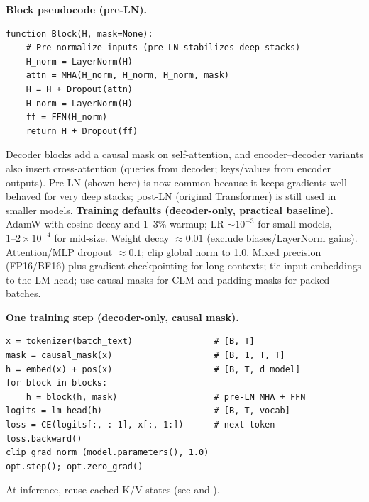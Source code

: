 \begin{tcolorbox}[summarybox, breakable, title={Implementation sketch: block pseudocode, training defaults, and one step}]
\noindent\textbf{Block pseudocode (pre-LN).}
\begin{verbatim}
function Block(H, mask=None):
    # Pre-normalize inputs (pre-LN stabilizes deep stacks)
    H_norm = LayerNorm(H)
    attn = MHA(H_norm, H_norm, H_norm, mask)
    H = H + Dropout(attn)
    H_norm = LayerNorm(H)
    ff = FFN(H_norm)
    return H + Dropout(ff)
\end{verbatim}
Decoder blocks add a causal mask on self-attention, and encoder--decoder variants also insert cross-attention (queries from decoder; keys/values from encoder outputs). Pre-LN (shown here) is now common because it keeps gradients well behaved for very deep stacks; post-LN (original Transformer) is still used in smaller models.
\medskip
\noindent\textbf{Training defaults (decoder-only, practical baseline).}
AdamW with cosine decay and 1--3\% warmup; LR \(\sim 10^{-3}\) for small models, \(1\text{--}2\times 10^{-4}\) for mid-size. Weight decay \(\approx 0.01\) (exclude biases/LayerNorm gains). Attention/MLP dropout \(\approx 0.1\); clip global norm to 1.0. Mixed precision (FP16/BF16) plus gradient checkpointing for long contexts; tie input embeddings to the LM head; use causal masks for CLM and padding masks for packed batches.

\medskip
\noindent\textbf{One training step (decoder-only, causal mask).}
\begin{verbatim}
x = tokenizer(batch_text)                # [B, T]
mask = causal_mask(x)                    # [B, 1, T, T]
h = embed(x) + pos(x)                    # [B, T, d_model]
for block in blocks:
    h = block(h, mask)                   # pre-LN MHA + FFN
logits = lm_head(h)                      # [B, T, vocab]
loss = CE(logits[:, :-1], x[:, 1:])      # next-token
loss.backward()
clip_grad_norm_(model.parameters(), 1.0)
opt.step(); opt.zero_grad()
\end{verbatim}
At inference, reuse cached K/V states (see  and ).
\end{tcolorbox}
